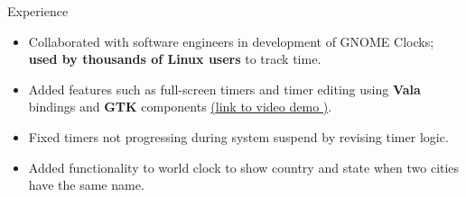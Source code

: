 \documentclass{resume} %
\begin{document}
\begin{workSection}{Experience}
	\experienceItem[
	company=GNOME Foundation,
	location=Remote,
	position=Open-Source Contributor,
	duration=December 2023 {-} June 2024
	]
	\begin{itemize}
	\vspace{-0.5em}
	\itemsep -6pt {}
	\item Collaborated with software engineers in development of GNOME Clocks; \textbf{used by thousands of Linux users} to track  time.
	\item Added features such as full-screen timers and timer editing using \textbf{Vala} bindings and \textbf{GTK} components \href{https://youtu.be/fDzYWusOLow}{(\underline{link to video demo \faExternalLink})}. %
	\item Fixed timers not progressing during system suspend by revising timer logic. %
	\item Added functionality to world clock to show country and state when two cities have the same name. %
	\end{itemize}
	

\end{workSection}
\end{document}
